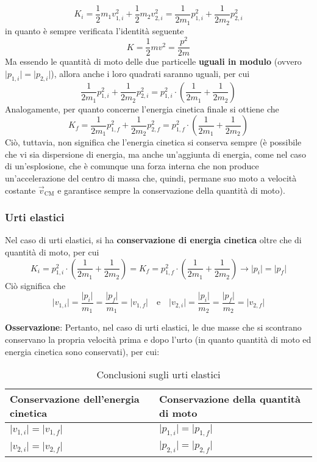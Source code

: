 \documentclass[a4paper]{extarticle}
\begin{document}
\[K_i = \frac{1}{2}m_1v_{1,i}^2 + \frac{1}{2}m_2v_{2,i}^2 = \frac{1}{2m_1} p_{1,i}^2 + \frac{1}{2m_2} p_{2,i}^2\]
in quanto è sempre verificata l'identità seguente
\[\boxed{K=\frac{1}{2}mv^2=\frac{p^2}{2m}}\]
Ma essendo le quantità di moto delle due particelle \textbf{uguali in modulo} (ovvero $\vert p_{1,i} \vert = \vert p_{2,i} \vert$), allora anche i loro quadrati saranno uguali, per cui
\[\frac{1}{2m_1} p_{1,i}^2 + \frac{1}{2m_2} p_{2,i}^2 = p_{1,i}^2 \cdot \left(\frac{1}{2m_1} + \frac{1}{2m_2}\right)\]
Analogamente, per quanto concerne l'energia cinetica finale si ottiene che
\[K_f = \frac{1}{2m_1} p_{1,f}^2 + \frac{1}{2m_2} p_{2,f}^2 = p_{1,f}^2 \cdot \left(\frac{1}{2m_1} + \frac{1}{2m_2}\right)\]
Ciò, tuttavia, non significa che l'energia cinetica si conserva sempre (è possibile che vi sia dispersione di energia, ma anche un'aggiunta di energia, come nel caso di un'esplosione, che è comunque una forza interna che non produce un'accelerazione del centro di massa che, quindi, permane suo moto a velocità costante $\vec v_{\text{CM}}$ e garantisce sempre la conservazione della quantità di moto).

\vspace{1em}
\subsubsection{Urti elastici}
Nel caso di urti elastici, si ha \textbf{conservazione di energia cinetica} oltre che di quantità di moto, per cui
\[K_i = p_{1,i}^2 \cdot \left(\frac{1}{2m_1} + \frac{1}{2m_2}\right) = K_f = p_{1,f}^2 \cdot \left(\frac{1}{2m_1} + \frac{1}{2m_2}\right) \longrightarrow \vert p_i \vert = \vert p_f \vert\]
Ciò significa che
\[\boxed{\vert v_{1,i} \vert = \frac{\vert p_i \vert}{m_1} = \frac{\vert p_f \vert}{m_1} = \vert v_{1,f} \vert} \hspace{1em} \text{e} \hspace{1em} \boxed{\vert v_{2,i} \vert = \frac{\vert p_i \vert}{m_2} = \frac{\vert p_f \vert}{m_2} = \vert v_{2,f} \vert}\]

\vspace{1em}
\noindent
\textbf{Osservazione}: Pertanto, nel caso di urti elastici, le due masse che si scontrano conservano la propria velocità prima e dopo l'urto (in quanto quantità di moto ed energia cinetica sono conservati), per cui:

\begin{table}[H]
  \begin{tabularx}{\textwidth}{|P|P|}
    \hline
    \textbf{Conservazione dell'energia cinetica} & \textbf{Conservazione della quantità di moto}\\
    \hline
    $\vert v_{1,i} \vert = \vert v_{1,f} \vert$ & $\vert p_{1,i} \vert = \vert p_{1,f} \vert$\\
    \hline
    $\vert v_{2,i} \vert = \vert v_{2,f} \vert$ & $\vert p_{2,i} \vert = \vert p_{2,f} \vert$\\
    \hline
  \end{tabularx}
  \caption{Conclusioni sugli urti elastici}
  \label{tab:conclusioni_urti_elastici}
\end{table}
\end{document}
